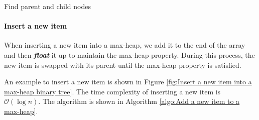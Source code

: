 \documentclass[12pt,a4paper]{ctexart}
\newcommand{\highlight}[1]{\textbf{\textit{#1}}}
\begin{document}
    \begin{algorithm}[!htbp]
        \caption{Find parent and child nodes}
        \label{algo:Find parent and child nodes}

        \BlankLine


        \BlankLine

    \end{algorithm}

    \paragraph{Insert a new item}

    When inserting a new item into a max-heap, we add it to the end of the array and then \highlight{float} it up to maintain the max-heap property. During this process, the new item is swapped with its parent until the max-heap property is satisfied.
    
    An example to insert a new item is shown in Figure \ref{fig:Insert a new item into a max-heap binary tree}. The time complexity of inserting a new item is $\mathcal O(\log n)$. The algorithm is shown in Algorithm \ref{algo:Add a new item to a max-heap}.
\end{document}
